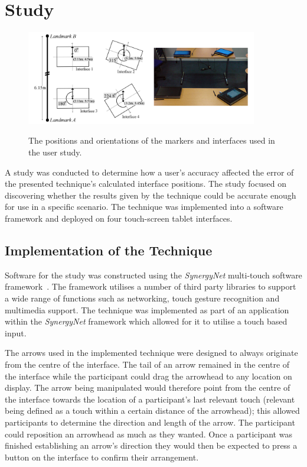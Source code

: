 \documentclass{bmcart}
\begin{document}
\section*{Study}\label{sec:study}

\begin{figure}[ht]
  \centering
   \caption{The positions and orientations of the markers and interfaces used in the user study.}
  \includegraphics[width=0.9\textwidth]{figures/studyLayout.png}
   \label{fig:room}
\end{figure}

A study was conducted to determine how a user's accuracy affected the error of the presented technique's calculated interface positions.
The study focused on discovering whether the results given by the technique could be accurate enough for use in a specific scenario.
The technique was implemented into a software framework and deployed on four touch-screen tablet interfaces.

\subsection*{Implementation of the Technique}\label{sec:implementation}

Software for the study was constructed using the {\emph{SynergyNet}} multi-touch software framework~\cite{AlAgha2010}.
The framework utilises a number of third party libraries to support a wide range of functions such as networking, touch gesture recognition and multimedia support.
The technique was implemented as part of an application within the {\emph{SynergyNet}} framework which allowed for it to utilise a touch based input.

The arrows used in the implemented technique were designed to always originate from the centre of the interface.
The tail of an arrow remained in the centre of the interface while the participant could drag the arrowhead to any location on display.
The arrow being manipulated would therefore point from the centre of the interface towards the location of a participant's last relevant touch (relevant being defined as a touch within a certain distance of the arrowhead); this allowed participants to determine the direction and length of the arrow.
The participant could reposition an arrowhead as much as they wanted.
Once a participant was finished establishing an arrow's direction they would then be expected to press a button on the interface to confirm their arrangement.
\end{document}
